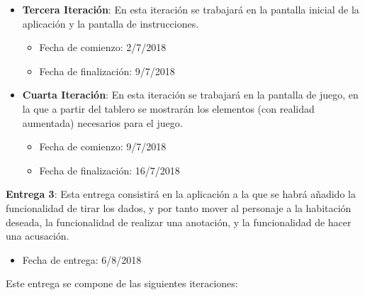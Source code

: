 \begin{itemize}
  \item \textbf{Tercera Iteración}: En esta iteración se trabajará en la pantalla inicial de la aplicación y la pantalla de instrucciones.

  \begin{itemize}
    \item Fecha de comienzo: 2/7/2018
    \item Fecha de finalización: 9/7/2018
  \end{itemize}

  \item \textbf{Cuarta Iteración}: En esta iteración se trabajará en la pantalla de juego, en la que a partir del tablero se mostrarán los elementos (con realidad aumentada) necesarios para el juego.

  \begin{itemize}
    \item Fecha de comienzo: 9/7/2018
    \item Fecha de finalización: 16/7/2018
  \end{itemize}
\end{itemize}

\hfill

\textbf{Entrega 3}: Esta entrega consistirá en la aplicación a la que se habrá añadido la funcionalidad de tirar los dados, y por tanto mover al personaje a la habitación deseada, la funcionalidad de realizar una anotación, y la funcionalidad de hacer una acusación.

\begin{itemize}
  \item Fecha de entrega: 6/8/2018
\end{itemize}

\hfill

Este entrega se compone de las siguientes iteraciones:

